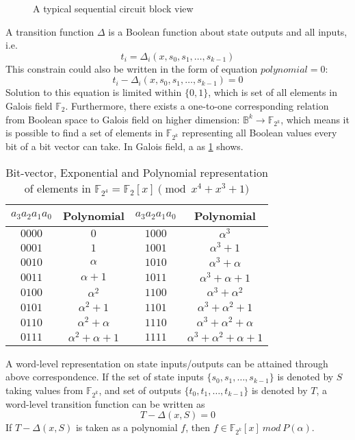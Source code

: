 \documentclass{acm_proc_article-sp}
\begin{document}
\begin{figure}
\centering
{}
\caption{A typical sequential circuit block view}
\label{fig:sequential}
\end{figure}

A transition function $\Delta$ is a Boolean function about state outputs and all inputs, i.e.
\begin{displaymath}
t_i = \Delta_i(x, s_0, s_1, \dots, s_{k-1})
\end{displaymath}
This constrain could also be written in the form of equation $polynomial = 0$:
\begin{displaymath}
t_i - \Delta_i(x, s_0, s_1, \dots, s_{k-1}) = 0
\end{displaymath}
Solution to this equation is limited within $\{0, 1\}$, which is set of all elements in Galois field $\mathbb{F}_2$.
Furthermore, there exists a one-to-one corresponding relation from Boolean space to Galois field on higher dimension: 
$\mathbb{B}^k \to \mathbb{F}_{2^k}$, which means it is possible to find a set of elements in $\mathbb{F}_{2^k}$ representing
all Boolean values every bit of a bit vector can take. In Galois field, a as \ref{table:booltogalois} shows.
\begin{table}[h]
\centering
\caption{Bit-vector, Exponential and Polynomial representation of
elements in  ${\mathbb{F}}_{2^4} = {\mathbb{F}}_2[x]
\pmod{x^4+x^3+1}$}\label{table:booltogalois}  
\begin{tabular}{|c|c||c|c|} 
\hline
$a_3a_2a_1a_0$ & Polynomial     &$a_3a_2a_1a_0$ & Polynomial  \\
\hline
$0000$        & $0$           & $1000$  &$\alpha^3$\\
\hline
$0001$        & $1$           & $1001$  & $\alpha^3 + 1$\\
\hline
$0010$        &  $\alpha$       & $1010$ & $\alpha^3 + \alpha$  \\
\hline
$0011$        &  $\alpha + 1$   & $1011$ &  $\alpha^3+\alpha+1$\\
\hline
$0100$        &  $\alpha^2$     &  $1100$ &  $\alpha^3 + \alpha^2$\\
\hline
$0101$        & $\alpha^2 + 1$ & $1101$  & $\alpha^3+\alpha^2+1$\\
\hline
$0110$        &  $\alpha^2 + \alpha$ & $1110$ &  $\alpha^3+\alpha^2+\alpha$\\
\hline
$0111$        & $\alpha^2+\alpha+1$ & $1111$ & $\alpha^3+\alpha^2+\alpha+1$\\
\hline
\end{tabular}
\end{table}
A word-level representation on state inputs/outputs can be attained through above correspondence. If the set of 
state inputs $\{s_0, s_1, \dots, s_{k-1}\}$ is denoted by $S$ taking values from $\mathbb{F}_{2^k}$, and
set of outputs $\{t_0, t_1, \dots, t_{k-1}\}$ is denoted by $T$, a word-level transition function can be written as
\begin{displaymath}
T - \Delta(x, S) = 0
\end{displaymath}
If $T - \Delta(x, S)$ is taken as a polynomial $f$, then $f \in \mathbb{F}_{2^k}[x]\ mod\ P(\alpha)$.
\end{document}
